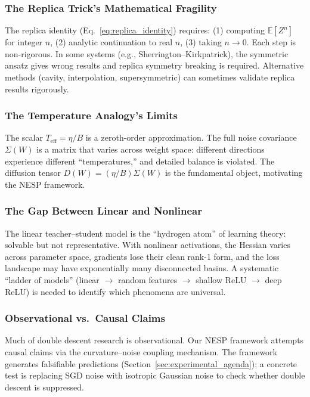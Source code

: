 \documentclass[
  journal=largetwo,
  year=2025,
  volume=37,
]{cup-journal}
\begin{document}
\subsubsection{The Replica Trick's Mathematical Fragility}
The replica identity (Eq.~\eqref{eq:replica_identity}) requires: (1) computing $\mathbb{E}[Z^n]$ for integer $n$, (2) analytic continuation to real $n$, (3) taking $n \to 0$. Each step is non-rigorous. In some systems (e.g., Sherrington--Kirkpatrick), the symmetric ansatz gives wrong results and replica symmetry breaking is required. Alternative methods (cavity, interpolation, supersymmetric) can sometimes validate replica results rigorously.

\subsubsection{The Temperature Analogy's Limits}
The scalar $T_{\text{eff}} = \eta/B$ is a zeroth-order approximation. The full noise covariance $\Sigma(W)$ is a matrix that varies across weight space: different directions experience different ``temperatures,'' and detailed balance is violated. The diffusion tensor $D(W) = (\eta/B)\Sigma(W)$ is the fundamental object, motivating the NESP framework.

\subsubsection{The Gap Between Linear and Nonlinear}
The linear teacher--student model is the ``hydrogen atom'' of learning theory: solvable but not representative. With nonlinear activations, the Hessian varies across parameter space, gradients lose their clean rank-1 form, and the loss landscape may have exponentially many disconnected basins. A systematic ``ladder of models'' (linear $\to$ random features $\to$ shallow ReLU $\to$ deep ReLU) is needed to identify which phenomena are universal.

\subsubsection{Observational vs.\ Causal Claims}
Much of double descent research is observational. Our NESP framework attempts causal claims via the curvature--noise coupling mechanism. The framework generates falsifiable predictions (Section~\ref{sec:experimental_agenda}); a concrete test is replacing SGD noise with isotropic Gaussian noise to check whether double descent is suppressed.
\end{document}

